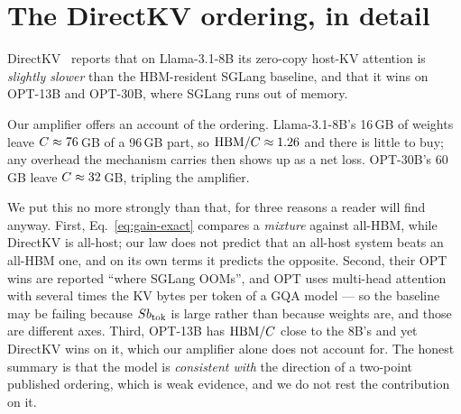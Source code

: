 
\section{The DirectKV ordering, in detail}
\label{app:directkv}

DirectKV~\cite{directkv} reports that on Llama-3.1-8B its zero-copy host-KV
attention is \emph{slightly slower} than the HBM-resident SGLang baseline, and
that it wins on OPT-13B and OPT-30B, where SGLang runs out of memory.

Our amplifier offers an account of the ordering. Llama-3.1-8B's 16\,GB of
weights leave $C \approx 76$\,GB of a 96\,GB part, so
$\mathrm{HBM}/C \approx 1.26$ and there is little to buy; any overhead the mechanism
carries then shows up as a net loss. OPT-30B's 60\,GB leave
$C \approx 32$\,GB, tripling the amplifier.

We put this no more strongly than that, for three reasons a reader will find
anyway. First, Eq.~\ref{eq:gain-exact} compares a \emph{mixture} against all-HBM,
while DirectKV is all-host; our law does not predict that an all-host system
beats an all-HBM one, and on its own terms it predicts the opposite. Second,
their OPT wins are reported ``where SGLang OOMs'', and OPT uses multi-head
attention with several times the KV bytes per token of a GQA model --- so the
baseline may be failing because $Sb_{\mathrm{tok}}$ is large rather than because weights
are, and those are different axes. Third, OPT-13B has $\mathrm{HBM}/C$ close to the
8B's and yet DirectKV wins on it, which our amplifier alone does not account
for. The honest summary is that the model is \emph{consistent with} the
direction of a two-point published ordering, which is weak evidence, and we do
not rest the contribution on it.
